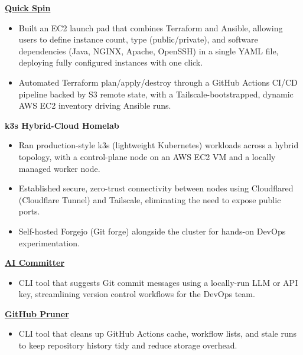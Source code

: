 \documentclass[a4paper,12pt]{article}
\begin{document}
\textbf{\href{https://github.com/ifaakash/QuickSpin}{Quick Spin}}
\begin{itemize}[leftmargin=*]
\item Built an EC2 launch pad that combines Terraform and Ansible, allowing users to define instance count, type (public/private), and software dependencies (Java, NGINX, Apache, OpenSSH) in a single YAML file, deploying fully configured instances with one click.
\item Automated Terraform plan/apply/destroy through a GitHub Actions CI/CD pipeline backed by S3 remote state, with a Tailscale-bootstrapped, dynamic AWS EC2 inventory driving Ansible runs.
\end{itemize}
\vspace{12pt}

\textbf{k3s Hybrid-Cloud Homelab}
\begin{itemize}[leftmargin=*]
\item Ran production-style k3s (lightweight Kubernetes) workloads across a hybrid topology, with a control-plane node on an AWS EC2 VM and a locally managed worker node.
\item Established secure, zero-trust connectivity between nodes using Cloudflared (Cloudflare Tunnel) and Tailscale, eliminating the need to expose public ports.
\item Self-hosted Forgejo (Git forge) alongside the cluster for hands-on DevOps experimentation.
\end{itemize}
\vspace{12pt}

\textbf{\href{https://github.com/ifaakash/ai_commit}{AI Committer}}
\begin{itemize}[leftmargin=*]
\item CLI tool that suggests Git commit messages using a locally-run LLM or API key, streamlining version control workflows for the DevOps team.
\end{itemize}
\vspace{12pt}

\textbf{\href{https://github.com/ifaakash/gh-prune}{GitHub Pruner}}
\begin{itemize}[leftmargin=*]
\item CLI tool that cleans up GitHub Actions cache, workflow lists, and stale runs to keep repository history tidy and reduce storage overhead.
\end{itemize}
\end{document}
